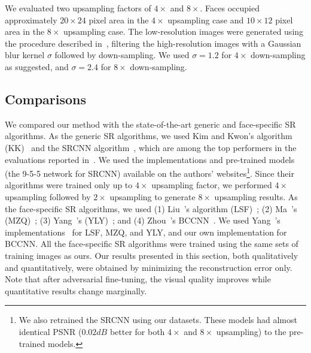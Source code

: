 \documentclass[runningheads]{llncs}
\begin{document}
We evaluated two upsampling factors of $4\times$ and $8\times$. Faces occupied approximately $20 \times 24$ pixel area in the  $4\times$ upsampling case and $10 \times 12$ pixel area in the $8\times$ upsampling case. The low-resolution images were generated using the procedure described in~\cite{Yang14ECCV}, filtering the high-resolution images with a Gaussian blur kernel $\sigma$ followed by down-sampling. We used $\sigma = 1.2$ for $4\times$ down-sampling as suggested, and $\sigma = 2.4$ for $8\times$ down-sampling.








\subsection{Comparisons}

We compared our method with the state-of-the-art generic and face-specific SR algorithms. As the generic SR algorithms, we used Kim and Kwon's algorithm (KK)~\cite{Kim10PAMI} and the SRCNN algorithm~\cite{Dong15PAMI}, which are among the top performers in the evaluations reported in~\cite{Yang14ECCV,Dong15PAMI}. We used the implementations and pre-trained models (the 9-5-5 network for SRCNN) available on the authors' websites\footnote{We also retrained the SRCNN using our datasets. These models had almost identical PSNR ($0.02dB$ better for both $4 \times$ and $8 \times$ upsampling) to the pre-trained models.}. Since their algorithms were trained only up to $4\times$ upsampling factor, we performed $4\times$ upsampling followed by $2\times$ upsampling to generate $8\times$ upsampling results. As the face-specific SR algorithms, we used (1) Liu~\etal's algorithm (LSF)~\cite{Liu07}; (2) Ma~\etal's (MZQ)~\cite{Ma10PR}; (3) Yang~\etal's (YLY)~\cite{Yang13CVPR}; and (4) Zhou~\etal's BCCNN~\cite{Zhou15AAAI}. We used Yang~\etal's implementations~\cite{Yang13CVPR} for LSF, MZQ, and YLY, and our own implementation for BCCNN. %
All the face-specific SR algorithms were trained using the same sets of training images as ours.
%
Our results presented in this section, both qualitatively and quantitatively, were obtained by minimizing the reconstruction error only. Note that after adversarial fine-tuning, the visual quality improves while quantitative results change marginally.
\end{document}
